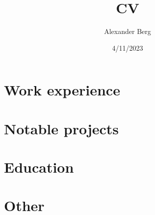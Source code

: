 \documentclass{Style}
\title{CV}
\author{Alexander Berg}
\date{4/11/2023}
\begin{document}


\section{Work experience}



\section{Notable projects}



\section{Education}



\section{Other}




\titlerule
\end{document}
